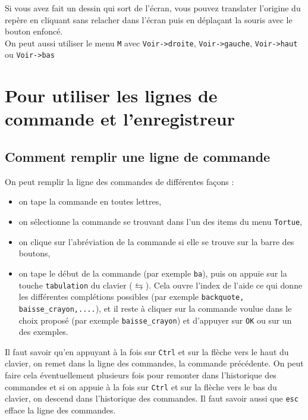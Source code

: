 \documentclass[a4paper,11pt]{book}
\begin{document}
Si vous avez fait un dessin qui sort de l'\'ecran, vous pouvez translater 
l'origine du rep\`ere en cliquant sans relacher dans l'\'ecran puis en 
d\'epla\c{c}ant la souris avec le bouton enfonc\'e.\\
On peut aussi utiliser le menu {\tt M} avec {\tt Voir->droite},
{\tt Voir->gauche}, {\tt Voir->haut} ou {\tt Voir->bas}
\section{Pour utiliser les lignes de commande et l'enregistreur}\label{sec:enregis}
\subsection{Comment remplir une ligne de commande}
On peut remplir la ligne des commandes de diff\'erentes fa\c{c}ons :
\begin{itemize}
\item on tape la commande en toutes lettres,
\item on  s\'electionne la commande se trouvant dans l'un des items du menu 
 {\tt Tortue},
\item on clique sur l'abr\'eviation de la commande si elle se trouve sur 
 la  barre des boutons,
\item on tape le d\'ebut de la commande (par exemple {\tt ba}), puis on 
appuie sur la touche {\tt tabulation} du clavier ($\leftrightarrows$). Cela 
ouvre l'index de l'aide ce qui donne les diff\'erentes compl\'etions possibles 
(par exemple {\tt backquote, baisse\_crayon,....}), et il reste \`a
cliquer sur la commande voulue dans le choix propos\'e (par exemple 
{\tt baisse\_crayon}) et d'appuyer sur {\tt OK} ou sur un des exemples. 
\end{itemize}
 Il faut savoir qu'en appuyant \`a la fois sur {\tt Ctrl} et sur
la fl\`eche vers le haut du clavier, on remet dans la ligne des commandes, 
la commande pr\'ec\'edente. On peut faire cela \'eventuellement plusieurs 
fois pour remonter dans l'historique des commandes et si on appuie \`a la fois 
sur {\tt Ctrl} et sur la fl\`eche vers le bas du clavier, on descend dans 
l'historique des commandes. Il faut  savoir aussi que {\tt esc} efface la ligne 
des commandes.
\end{document}
